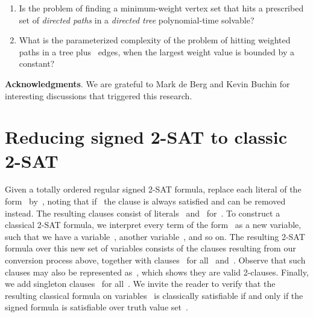\let\accentvec\vec  \documentclass{llncs}
\begin{document}
\begin{enumerate}
	\item Is the problem of finding a minimum-weight vertex set that hits a prescribed set of \emph{directed paths} in a \emph{directed tree} polynomial-time solvable?
	\item What is the parameterized complexity of the problem of hitting weighted paths in a tree plus~ edges, when the largest weight value is bounded by a constant?
\end{enumerate}

\textbf{Acknowledgments}. We are grateful to Mark de Berg and Kevin Buchin for interesting discussions that triggered this research.




\clearpage

\appendix

\section{Reducing signed 2-SAT to classic 2-SAT} \label{app:twosat}
Given a totally ordered regular signed 2-SAT formula, replace each literal of the form~ by~, noting that if~ the clause is always satisfied and can be removed instead. The resulting clauses consist of literals~ and~ for~. To construct a classical 2-SAT formula, we interpret every term of the form~ as a new variable, such that we have a variable~, another variable~, and so on. The resulting 2-SAT formula over this new set of variables consists of the clauses resulting from our conversion process above, together with clauses~ for all~ and~. Observe that such clauses may also be represented as~, which shows they are valid 2-clauses. Finally, we add singleton clauses~ for all~. We invite the reader to verify that the resulting classical formula on variables~ is classically satisfiable if and only if the signed formula is satisfiable over truth value set~.
\end{document}
